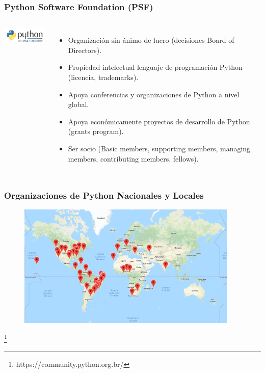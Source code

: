 \documentclass[18pt]{beamer}
\newcommand\blfootnote[1]{%
  \begingroup
  \renewcommand\thefootnote{}\footnote{#1}%
  \addtocounter{footnote}{-1}%
  \endgroup
}
\begin{document}
\begin{frame}

	\frametitle{Python Software Foundation (PSF)}
		
	\begin{columns}
		\centering
			\includegraphics[width=3.5cm]{images/psf.png}
			
		\begin{itemize}
			\setlength\itemsep{0.6em}		
			\item Organización sin ánimo de lucro (decisiones Board of Directors).
			\item Propiedad intelectual lenguaje de programación Python (licencia, trademarks).
			\item Apoya conferencias y organizaciones de Python a nivel global.
			\item Apoya económicamente proyectos de desarrollo de Python (grants program).
			\item Ser socio (Basic members, supporting members, managing members, 
			contributing members, fellows).  
		\end{itemize}
	\end{columns}
	
\end{frame}


\begin{frame}

	\frametitle{Organizaciones de Python Nacionales y Locales}
	
	\begin{figure}
		\includegraphics[width=10.5cm]{images/local_communities.png}
	\end{figure}
	
	\blfootnote{\scriptsize https://community.python.org.br/}
	
\end{frame}
\end{document}
